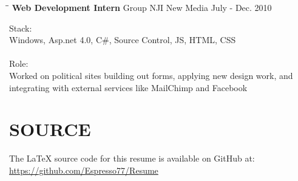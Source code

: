 \documentclass{res}
\begin{document}
\begin{resume}
   \begin{tabbing}
		\hspace{2.3in}\= \hspace{2.6in}\= \kill %
		\textbf{Web Development Intern} \>Group NJI New Media \> July - Dec. 2010 \\
   \end{tabbing}\vspace{-20pt}
   
    Stack: \\
	Windows, Asp.net 4.0, C\#, Source Control, JS, HTML, CSS \\
	\\
	Role: \\
	Worked on political sites building out forms, applying new design work, and integrating 
	with external services like MailChimp and Facebook\\
	
\section{SOURCE}
	The LaTeX source code for this resume is available on GitHub at: \\
	\url{https://github.com/Espresso77/Resume}
 
\end{resume}
\end{document}
